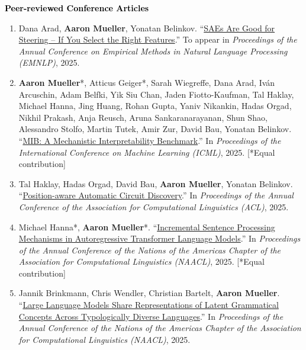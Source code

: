 \documentclass[10pt]{article}
\renewcommand{\section}[1]{\pagebreak[3]%
	\vspace{0.5\baselineskip}%
	\phantomsection\addcontentsline{toc}{section}{#1}%
	\noindent\llap{\bf\scshape\smash{\parbox[t]{\marginparwidth}{\hyphenpenalty=10000\raggedright \textcolor{black}{#1}}}}%
	\vspace{-\baselineskip}\par}
\renewcommand{\subsection}[1]{\textcolor{black}{#1}}
\providecommand*\titlelink[2]{\href{#1}{\textcolor{accent}{#2}}}
\begin{document}
	\section{Publications}

	\subsection{\textbf{Peer-reviewed Conference Articles}}
	\begin{enumerate}[leftmargin=*, topsep=0pt, itemsep=0.25ex, partopsep=0ex, parsep=1ex, label=C\arabic*., ref=C\arabic*]

	\item Dana Arad, \textbf{Aaron Mueller}, Yonatan Belinkov. ``\titlelink{https://arxiv.org/abs/2505.20063}{SAEs Are Good for Steering -- If You Select the Right Features}.'' To appear in \emph{Proceedings of the Annual Conference on Empirical Methods in Natural Language Processing (EMNLP)}, 2025.
	
	\item \textbf{Aaron Mueller}*, Atticus Geiger*, Sarah Wiegreffe, Dana Arad, Iván Arcuschin, Adam Belfki, Yik Siu Chan, Jaden Fiotto-Kaufman, Tal Haklay, Michael Hanna, Jing Huang, Rohan Gupta, Yaniv Nikankin, Hadas Orgad, Nikhil Prakash, Anja Reusch, Aruna Sankaranarayanan, Shun Shao, Alessandro Stolfo, Martin Tutek, Amir Zur, David Bau, Yonatan Belinkov. ``\titlelink{https://arxiv.org/abs/2504.13151}{MIB: A Mechanistic Interpretability Benchmark}.'' In \emph{Proceedings of the International Conference on Machine Learning (ICML)}, 2025. [*Equal contribution]\label{pub:mib}
	
	\item Tal Haklay, Hadas Orgad, David Bau, \textbf{Aaron Mueller}, Yonatan Belinkov. ``\titlelink{https://arxiv.org/abs/2502.04577}{Position-aware Automatic Circuit Discovery}.'' In \emph{Proceedings of the Annual Conference of the Association for Computational Linguistics (ACL)}, 2025.\label{pub:position-circuits}
	
	\item Michael Hanna*, \textbf{Aaron Mueller}*. ``\titlelink{https://arxiv.org/abs/2412.05353}{Incremental Sentence Processing Mechanisms in Autoregressive Transformer Language Models}.'' In \emph{Proceedings of the Annual Conference of the Nations of the Americas Chapter of the Association for Computational Linguistics (NAACL)}, 2025. [*Equal contribution]\label{pub:garden-path-mech}
	
	\item Jannik Brinkmann, Chris Wendler, Christian Bartelt, \textbf{Aaron Mueller}. ``\titlelink{https://arxiv.org/abs/2501.06346}{Large Language Models Share Representations of Latent Grammatical Concepts Across Typologically Diverse Languages}.'' In \emph{Proceedings of the Annual Conference of the Nations of the Americas Chapter of the Association for Computational Linguistics (NAACL)}, 2025.\label{pub:multilingual-concepts}
	

\end{enumerate}
\end{document}

